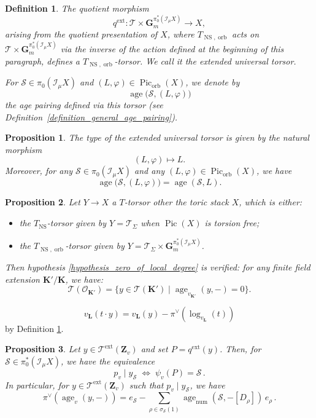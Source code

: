 \documentclass[10pt,a4paper]{amsart}
\newtheorem{definition}{Definition}
\newtheorem{prop}{Proposition}
\newcommand{\G}{\mathbf{G}}
\newcommand{\K}{\mathbf{K}}
\newcommand{\Le}{\mathbf{L}}
\DeclareMathOperator{\NS}{NS}
\DeclareMathOperator{\Pic}{Pic}
\newcommand{\Z}{\mathbf{Z}}
\DeclareMathOperator{\age}{age}
\DeclareMathOperator{\ext}{ext}
\DeclareMathOperator{\num}{num}
\DeclareMathOperator{\orb}{orb}
\newcommand{\sector}{\pi_0(\sheafI_{\mu} X)}
\newcommand{\sheafI}{\mathcal{I}}
\newcommand{\sheafO}{\mathcal{O}}
\newcommand{\stackS}{\mathcal{S}}
\newcommand{\stackT}{\mathcal{T}}
\newcommand{\twistsector}{\pi_0^*(\sheafI_{\mu} X)}
\begin{document}
\begin{definition}\label{definition_extended_universal_torsor}
The quotient morphism
\[
q^{\ext} : \stackT \times \G_m^{\twistsector} \longrightarrow X,
\]
arising from the quotient presentation of $X$, where $T_{\NS,\orb}$ acts on
$\stackT \times \G_m^{\twistsector}$ via the inverse of the action defined at the
beginning of this paragraph, defines a $T_{\NS,\orb}$-torsor. We call it the
\emph{extended universal torsor}.

For $\stackS \in \sector$ and $(L,\varphi) \in \Pic_{\orb}(X)$, we denote by
\[
\age\bigl(\stackS,(L,\varphi)\bigr)
\]
the age pairing defined via this torsor (see Definition~\ref{definition_general_age_pairing}).
\end{definition}

\begin{prop}\label{proposition_functoriality_age}
The type of the extended universal torsor is given by the natural morphism
\[
(L,\varphi) \longmapsto L.
\]
Moreover, for any $\stackS \in \sector$ and any $(L,\varphi) \in \Pic_{\orb}(X)$, we have
\[
\age\bigl(\stackS,(L,\varphi)\bigr) = \age(\stackS,L).
\]
\end{prop}

\begin{prop}\label{prop_extended_univ_torsor_zero_age}
    Let $Y \rightarrow X$ a $T$-torsor other the toric stack $X$, which is either:
    \begin{itemize}
        \item the $T_{\NS}$-torsor given by $Y = \stackT_{\Sigma}$ when $\Pic(X)$ is torsion free;
        \item the $T_{\NS,\orb}$-torsor given by $Y = \stackT_{\Sigma} \times \G_m^{\twistsector}$.
    \end{itemize}
     Then hypothesis \ref{hypothesis_zero_of_local_degree} is verified: for any finite field extension $\K' / \K$, we have:
    $$\stackT(\sheafO_{\K'}) = \{y \in \stackT(\K') \mid \age_{v_{\K'}}(y,-) = 0 \} . $$
\end{prop}

\begin{equation}\label{equation_formula_equivariance_valuation}
v_{\Le}(t \cdot y) = v_{\Le}(y) - \pi^{\vee}\left(\log_{v_{\Le}}(t)\right)    
\end{equation}by Definition \ref{definition_extended_universal_torsor}.

\begin{prop}\label{proposition_computation_residue_map_extended_parametrisation}
Let $y \in \stackT^{\ext}(\Z_v)$ and set $P = q^{\ext}(y)$. Then, for $\stackS \in \twistsector$, we have the equivalence
\[
p_v \mid y_{\stackS}
\;\Longleftrightarrow\;
\psi_v(P) = \stackS \, .
\]
In particular, for $y \in \stackT^{\ext}(\Z_v)$ such that $p_v \mid y_{\stackS}$, we have
\[
\pi^{\vee}\!\left( \age_v(y,-) \right)
= e_{\stackS}
-
\sum_{\rho \in \sigma_\stackS(1)}
\age_{\num}\!\left(\stackS,-[D_{\rho}]\right)\, e_{\rho} \, .
\]
\end{prop}
\end{document}
